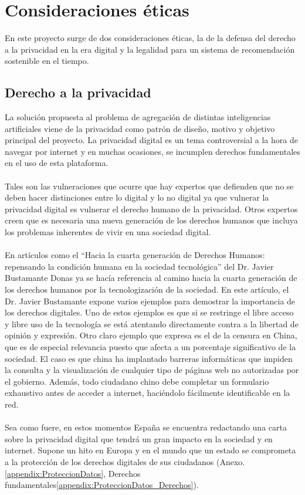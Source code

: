 \chapter{Consideraciones éticas}
\thispagestyle{fancy}

En este proyecto surge de dos consideraciones éticas, la de la defensa del derecho a la privacidad en la era digital y la legalidad para un sistema de recomendación sostenible en el tiempo.

\section{Derecho a la privacidad}

La solución propuesta al problema de agregación de distintas inteligencias artificiales viene de la privacidad como patrón de diseño, motivo y objetivo principal del proyecto. La privacidad digital es un tema controversial a la hora de navegar por internet y en muchas ocasiones, se incumplen derechos fundamentales en el uso de esta plataforma.
\\\\
Tales son las vulneraciones que ocurre que hay expertos que defienden que no se deben hacer distinciones entre lo digital y lo no digital ya que vulnerar la privacidad digital es vulnerar el derecho humano de la privacidad. Otros expertos creen que es necesaria una nueva generación de los derechos humanos que incluya los problemas inherentes de vivir en una sociedad digital.
\\\\
En artículos como el “Hacia la cuarta generación de Derechos Humanos: repensando la condición humana en la sociedad tecnológica”\autocite{donasHACIACUARTAGENERACION} del Dr. Javier Bustamante Donas ya se hacía referencia al camino hacia la cuarta generación de los derechos humanos por la tecnologización de la sociedad. En este artículo, el Dr. Javier Bustamante expone varios ejemplos para demostrar la importancia de los derechos digitales. Uno de estos ejemplos es que si se restringe el libre acceso y libre uso de la tecnología se está atentando directamente contra a la libertad de opinión y expresión. Otro claro ejemplo que expresa es el de la censura en China, que es de especial relevancia puesto que afecta a un porcentaje significativo de la sociedad. El caso es que china ha implantado barreras informáticas que impiden la consulta y la visualización de cualquier tipo de páginas web no autorizadas por el gobierno. Además, todo ciudadano chino debe completar un formulario exhaustivo antes de acceder a internet, haciéndolo fácilmente identificable en la red.
\\\\
Sea como fuere, en estos momentos España se encuentra redactando una carta sobre la privacidad digital que tendrá un gran impacto en la sociedad y en internet. Supone un hito en Europa y en el mundo que un estado se comprometa a la protección de los derechos digitales de sus ciudadanos (Anexo.\ref{appendix:ProteccionDatos}, Derechos fundamentales\ref{appendix:ProteccionDatos_Derechos}).

